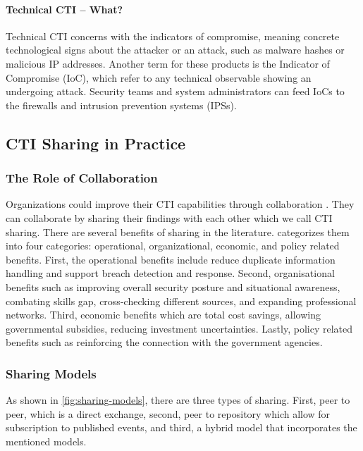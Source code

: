 \paragraph*{Technical CTI -- What?}
Technical CTI concerns with the indicators of compromise, meaning concrete technological signs about the attacker or an attack, such as malware hashes or malicious IP addresses. Another term for these products is the Indicator of Compromise (IoC), which refer to any technical observable showing an undergoing attack. Security teams and system administrators can feed IoCs to the firewalls and intrusion prevention systems (IPSs).

\subsection{CTI Sharing in Practice}

\subsubsection{The Role of Collaboration}
Organizations could improve their CTI capabilities through collaboration \cite{zibak_cyber_2019}. They can collaborate by sharing their findings with each other which we call CTI sharing. There are several benefits of sharing in the literature. \cite{zibak_cyber_2019} categorizes them into four categories: operational, organizational, economic, and policy related benefits. First, the operational benefits include reduce duplicate information handling and support breach detection and response. Second, organisational benefits such as improving overall security posture and situational awareness, combating skills gap, cross-checking different sources, and expanding professional networks. Third, economic benefits which are total cost savings, allowing governmental subsidies, reducing investment uncertainties. Lastly, policy related benefits such as reinforcing the connection with the government agencies.

\subsubsection{Sharing Models}

As shown in \ref{fig:sharing-models}, there are three types of sharing. First, peer to peer, which is a direct exchange, second, peer to repository which allow for subscription to published events, and third, a hybrid model that incorporates the mentioned models.

